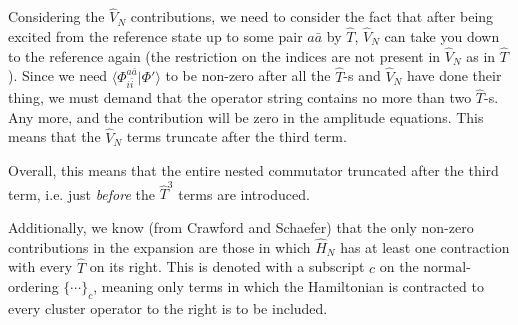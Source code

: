 \documentclass[a4paper]{article}
\begin{document}
Considering the $\hat V_N$ contributions, we need to consider the fact that after being excited from the reference state up to some pair $a\bar a$ by $\hat T$, $\hat V_N$ can take you down to the reference again (the restriction on the indices are not present in $\hat V_N$ as in $\hat T$). Since we need $\langle \Phi_{i\bar i}^{a\bar a}| \Phi'\rangle$ to be non-zero after all the $\hat T$-s and $\hat V_N$ have done their thing, we must demand that the operator string contains no more than two $\hat T$-s. Any more, and the contribution will be zero in the amplitude equations. This means that the $\hat V_N$ terms truncate after the third term.

Overall, this means that the entire nested commutator truncated after the third term, i.e. just \emph{before} the $\hat T^3$ terms are introduced. 

Additionally, we know (from Crawford and Schaefer) that the only non-zero contributions in the expansion are those in which $\hat H_N$ has at least one contraction with every $\hat T$ on its right. This is denoted with a subscript $c$ on the normal-ordering $\{\cdots\}_c$, meaning only terms in which the Hamiltonian is contracted to every cluster operator to the right is to be included.
\end{document}
